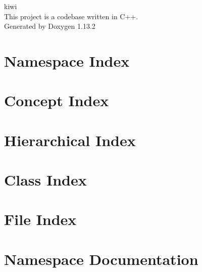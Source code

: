 \documentclass[twoside]{book}
\newcommand{\+}{\discretionary{\mbox{\scriptsize$\hookleftarrow$}}{}{}}
\newcommand{\clearemptydoublepage}{%
    \newpage{\pagestyle{empty}\cleardoublepage}%
  }
\begin{document}
  \raggedbottom
    \hypersetup{pageanchor=false,
                bookmarksnumbered=true,
                pdfencoding=unicode
               }
  \begin{titlepage}
  \vspace*{7cm}
  \begin{center}%
  {\Large kiwi}\\
  [1ex]\large This project is a codebase written in C++. \\
  \vspace*{1cm}
  {\large Generated by Doxygen 1.13.2}\\
  \end{center}
  \end{titlepage}
  \clearemptydoublepage
  \tableofcontents
  \clearemptydoublepage
  \hypersetup{pageanchor=true}
\chapter{Namespace Index}

\chapter{Concept Index}

\chapter{Hierarchical Index}

\chapter{Class Index}

\chapter{File Index}

\chapter{Namespace Documentation}

\end{document}
